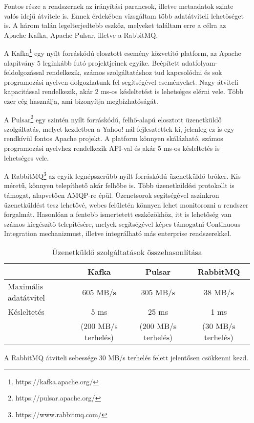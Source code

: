 \documentclass[11pt,a4paper,oneside]{article}
\begin{document}
Fontos része a rendszernek az irányítási parancsok, illetve metaadatok szinte valós idejű átvitele is. Ennek érdekében vizsgáltam több adatátviteli lehetőséget is. A három talán legelterjedtebb eszköz, melyeket találtam erre a célra az Apache Kafka, Apache Pulsar, illetve a RabbitMQ.

A Kafka\footnote{https://kafka.apache.org/} egy nyílt forráskódú elosztott esemény közvetítő platform, az Apache alapítvány 5 leginkább futó projektjeinek egyike. Beépített adatfolyam-feldolgozással rendelkezik, számos szolgáltatáshoz tud kapcsolódni és sok programozási nyelven dolgozhatunk fel segítségével eseményeket. Nagy átviteli kapacitással rendelkezik, akár 2 ms-os késleltetést is lehetséges elérni vele. Több ezer cég használja, ami bizonyítja megbízhatóságát.

A Pulsar\footnote{https://pulsar.apache.org/} egy szintén nyílt forráskódú, felhő-alapú elosztott üzenetküldő szolgáltatás, melyet kezdetben a Yahoo!-nál fejlesztettek ki, jelenleg ez is egy rendkívül fontos Apache projekt. A platform könnyen skálázható, számos programozási nyelvhez rendelkezik API-val és akár 5 ms-os késleltetés is lehetséges vele.

A RabbitMQ\footnote{https://www.rabbitmq.com/} az egyik legnépszerűbb nyílt forráskódú üzenetküldő bróker. Kis méretű, könnyen telepíthető akár felhőbe is. Több üzenetküldési protokollt is támogat, alapvetően AMQP-re épül. Üzenetsorok segítségével aszinkron üzenetküldést tesz lehetővé, webes felületén könnyen lehet monitorozni a rendszer forgalmát. Hasonlóan a fentebb ismertetett eszközökhöz, itt is lehetőség van számos kiegészítő telepítésére, melyek segítségével képes támogatni Continuous Integration mechanizmust, illetve integrálható más enterprise rendszerekkel.

\begin{table}
  \caption{Üzenetküldő szolgáltatások összehasonlítása}
  \label{table:compare_brokers}
  \begin{tabular}{l|c|c|c}
    & Kafka & Pulsar & RabbitMQ\\
    \hline
    \hline
    Maximális adatátvitel & 605 MB/s & 305 MB/s & 38 MB/s \\
    \hline
    Késleltetés & 5 ms & 25 ms & 1 ms\\
    & (200 MB/s terhelés) & (200 MB/s terhelés) & (30 MB/s terhelés)
  \end{tabular}
  A RabbitMQ átviteli sebessége 30 MB/s terhelés felett jelentősen csökkenni kezd.
\end{table}
\end{document}

